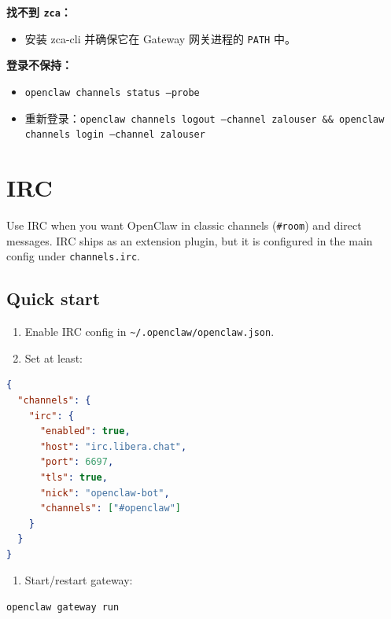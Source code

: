 \textbf{找不到 \texttt{zca}：}

\begin{itemize}
  \item 安装 zca-cli 并确保它在 Gateway 网关进程的 \texttt{PATH} 中。
\end{itemize}


\textbf{登录不保持：}

\begin{itemize}
  \item \texttt{openclaw channels status --probe}
  \item 重新登录：\texttt{openclaw channels logout --channel zalouser \&\& openclaw channels login --channel zalouser}
\end{itemize}



\clearpage
\section{IRC}

Use IRC when you want OpenClaw in classic channels (\texttt{\#room}) and direct messages.
IRC ships as an extension plugin, but it is configured in the main config under \texttt{channels.irc}.

\subsection{Quick start}


\begin{enumerate}
  \item Enable IRC config in \texttt{\textasciitilde{}/.openclaw/openclaw.json}.
  \item Set at least:
\end{enumerate}


\begin{lstlisting}[language=json]
{
  "channels": {
    "irc": {
      "enabled": true,
      "host": "irc.libera.chat",
      "port": 6697,
      "tls": true,
      "nick": "openclaw-bot",
      "channels": ["#openclaw"]
    }
  }
}
\end{lstlisting}


\begin{enumerate}
  \item Start/restart gateway:
\end{enumerate}


\begin{lstlisting}[language=bash]
openclaw gateway run
\end{lstlisting}


